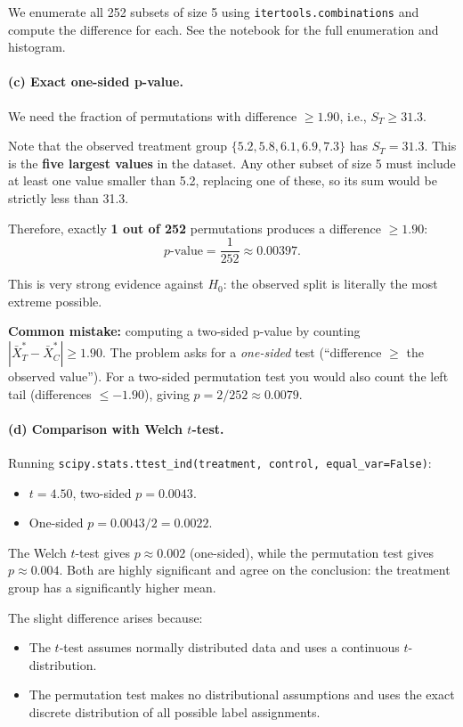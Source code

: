 \documentclass[11pt]{article}
\begin{document}
We enumerate all 252 subsets of size 5 using \texttt{itertools.combinations} and compute the difference for each. See the notebook for the full enumeration and histogram.

\paragraph{(c) Exact one-sided p-value.}

We need the fraction of permutations with difference $\geq 1.90$, i.e., $S_T \geq 31.3$.

Note that the observed treatment group $\{5.2, 5.8, 6.1, 6.9, 7.3\}$ has $S_T = 31.3$. This is the \textbf{five largest values} in the dataset. Any other subset of size 5 must include at least one value smaller than 5.2, replacing one of these, so its sum would be strictly less than 31.3.

Therefore, exactly \textbf{1 out of 252} permutations produces a difference $\geq 1.90$:
\[
  \boxed{p\text{-value} = \frac{1}{252} \approx 0.00397}.
\]

This is very strong evidence against $H_0$: the observed split is literally the most extreme possible.

\textbf{Common mistake:} computing a two-sided p-value by counting $|\bar{X}_T^* - \bar{X}_C^*| \geq 1.90$. The problem asks for a \textit{one-sided} test (``difference $\geq$ the observed value''). For a two-sided permutation test you would also count the left tail (differences $\leq -1.90$), giving $p = 2/252 \approx 0.0079$.

\paragraph{(d) Comparison with Welch $t$-test.}

Running \texttt{scipy.stats.ttest\_ind(treatment, control, equal\_var=False)}:

\begin{itemize}
  \item $t = 4.50$, two-sided $p = 0.0043$.
  \item One-sided $p = 0.0043 / 2 = 0.0022$.
\end{itemize}

The Welch $t$-test gives $p \approx 0.002$ (one-sided), while the permutation test gives $p \approx 0.004$. Both are highly significant and agree on the conclusion: the treatment group has a significantly higher mean.

The slight difference arises because:
\begin{itemize}
  \item The $t$-test assumes normally distributed data and uses a continuous $t$-distribution.
  \item The permutation test makes no distributional assumptions and uses the exact discrete distribution of all possible label assignments.
\end{itemize}
\end{document}
